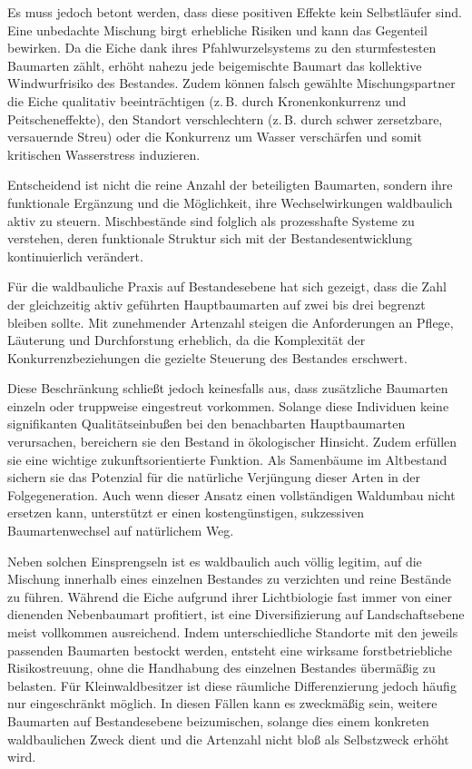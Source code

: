 \documentclass[twocolumn, bibliography=totoc, abstract=true]{scrartcl}
\begin{document}
Es muss jedoch betont werden, dass diese positiven Effekte kein Selbstläufer sind. Eine unbedachte Mischung birgt erhebliche Risiken und kann das Gegenteil bewirken. Da die Eiche dank ihres Pfahlwurzelsystems zu den sturmfestesten Baumarten zählt, erhöht nahezu jede beigemischte Baumart das kollektive Windwurfrisiko des Bestandes. Zudem können falsch gewählte Mischungspartner die Eiche qualitativ beeinträchtigen (z.\,B. durch Kronenkonkurrenz und Peitscheneffekte), den Standort verschlechtern (z.\,B. durch schwer zersetzbare, versauernde Streu) oder die Konkurrenz um Wasser verschärfen und somit kritischen Wasserstress induzieren.

Entscheidend ist nicht die reine Anzahl der beteiligten Baumarten, sondern ihre funktionale Ergänzung und die Möglichkeit, ihre Wechselwirkungen waldbaulich aktiv zu steuern. Mischbestände sind folglich als prozesshafte Systeme zu verstehen, deren funktionale Struktur sich mit der Bestandesentwicklung kontinuierlich verändert.

Für die waldbauliche Praxis auf Bestandesebene hat sich gezeigt, dass die Zahl der gleichzeitig aktiv geführten Hauptbaumarten auf zwei bis drei begrenzt bleiben sollte. Mit zunehmender Artenzahl steigen die Anforderungen an Pflege, Läuterung und Durchforstung erheblich, da die Komplexität der Konkurrenzbeziehungen die gezielte Steuerung des Bestandes erschwert. 

Diese Beschränkung schließt jedoch keinesfalls aus, dass zusätzliche Baumarten einzeln oder truppweise eingestreut vorkommen. Solange diese Individuen keine signifikanten Qualitätseinbußen bei den benachbarten Hauptbaumarten verursachen, bereichern sie den Bestand in ökologischer Hinsicht. Zudem erfüllen sie eine wichtige zukunftsorientierte Funktion. Als Samenbäume im Altbestand sichern sie das Potenzial für die natürliche Verjüngung dieser Arten in der Folgegeneration. Auch wenn dieser Ansatz einen vollständigen Waldumbau nicht ersetzen kann, unterstützt er einen kostengünstigen, sukzessiven Baumartenwechsel auf natürlichem Weg.

Neben solchen Einsprengseln ist es waldbaulich auch völlig legitim, auf die Mischung innerhalb eines einzelnen Bestandes zu verzichten und reine Bestände zu führen. Während die Eiche aufgrund ihrer Lichtbiologie fast immer von einer dienenden Nebenbaumart profitiert, ist eine Diversifizierung auf Landschaftsebene meist vollkommen ausreichend. Indem unterschiedliche Standorte mit den jeweils passenden Baumarten bestockt werden, entsteht eine wirksame forstbetriebliche Risikostreuung, ohne die Handhabung des einzelnen Bestandes übermäßig zu belasten. Für Kleinwaldbesitzer ist diese räumliche Differenzierung jedoch häufig nur eingeschränkt möglich. In diesen Fällen kann es zweckmäßig sein, weitere Baumarten auf Bestandesebene beizumischen, solange dies einem konkreten waldbaulichen Zweck dient und die Artenzahl nicht bloß als Selbstzweck erhöht wird.
\end{document}
